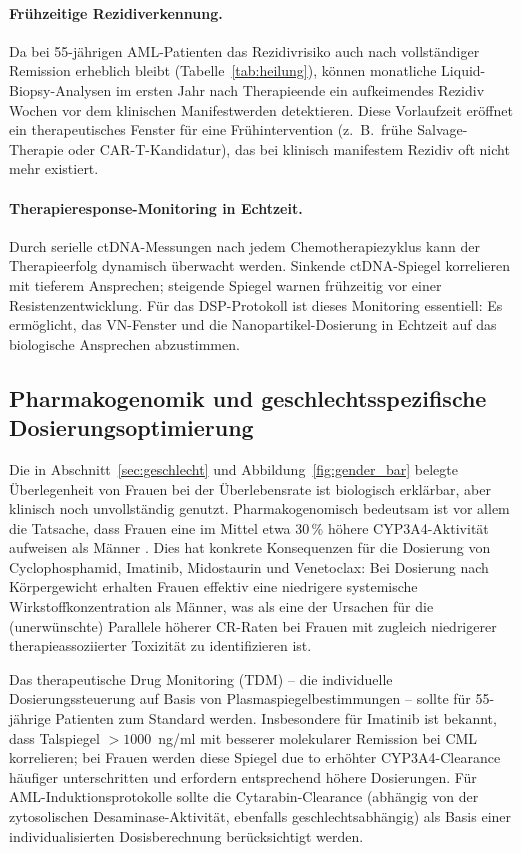 ﻿\documentclass[12pt,a4paper]{article}
\theoremstyle{definition}
\begin{document}
\paragraph{Frühzeitige Rezidiverkennung.}
Da bei 55-jährigen AML-Patienten das Rezidivrisiko auch nach vollständiger Remission
erheblich bleibt (Tabelle~\ref{tab:heilung}), können monatliche Liquid-Biopsy-Analysen
im ersten Jahr nach Therapieende ein aufkeimendes Rezidiv Wochen vor dem klinischen
Manifestwerden detektieren. Diese Vorlaufzeit eröffnet ein therapeutisches Fenster
für eine Frühintervention (z.~B.\ frühe Salvage-Therapie oder CAR-T-Kandidatur), das
bei klinisch manifestem Rezidiv oft nicht mehr existiert.

\paragraph{Therapieresponse-Monitoring in Echtzeit.}
Durch serielle ctDNA-Messungen nach jedem Chemotherapiezyklus kann der Therapieerfolg
dynamisch überwacht werden. Sinkende ctDNA-Spiegel korrelieren mit tieferem Ansprechen;
steigende Spiegel warnen frühzeitig vor einer Resistenzentwicklung. Für das DSP-Protokoll
ist dieses Monitoring essentiell: Es ermöglicht, das VN-Fenster und die Nanopartikel-Dosierung
in Echtzeit auf das biologische Ansprechen abzustimmen.

\subsection{Pharmakogenomik und geschlechtsspezifische Dosierungsoptimierung}

Die in Abschnitt~\ref{sec:geschlecht} und Abbildung~\ref{fig:gender_bar} belegte
Überlegenheit von Frauen bei der Überlebensrate ist biologisch erklärbar, aber
klinisch noch unvollständig genutzt. Pharmakogenomisch bedeutsam ist vor allem die
Tatsache, dass Frauen eine im Mittel etwa 30\,\% höhere CYP3A4-Aktivität aufweisen
als Männer \cite{frey2010}. Dies hat konkrete Konsequenzen für die Dosierung von
Cyclophosphamid, Imatinib, Midostaurin und Venetoclax: Bei Dosierung nach Körpergewicht
erhalten Frauen effektiv eine niedrigere systemische Wirkstoffkonzentration als Männer,
was als eine der Ursachen für die (unerwünschte) Parallele höherer CR-Raten bei
Frauen mit zugleich niedrigerer therapieassoziierter Toxizität zu identifizieren ist.

Das therapeutische Drug Monitoring (TDM) -- die individuelle Dosierungssteuerung auf
Basis von Plasmaspiegelbestimmungen -- sollte für 55-jährige Patienten zum Standard
werden. Insbesondere für Imatinib ist bekannt, dass Talspiegel $>1000$~ng/ml mit
besserer molekularer Remission bei CML korrelieren; bei Frauen werden diese Spiegel
due to erhöhter CYP3A4-Clearance häufiger unterschritten und erfordern entsprechend
höhere Dosierungen. Für AML-Induktionsprotokolle sollte die Cytarabin-Clearance
(abhängig von der zytosolischen Desaminase-Aktivität, ebenfalls geschlechtsabhängig)
als Basis einer individualisierten Dosisberechnung berücksichtigt werden.
\end{document}
